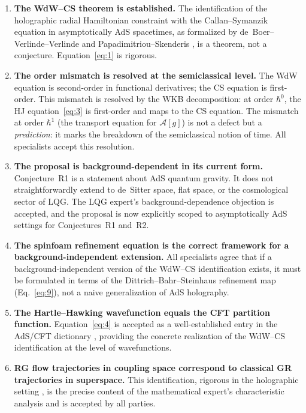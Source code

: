 \documentclass[11pt,a4paper]{article}
\begin{document}
\begin{enumerate}

  \item \textbf{The WdW--CS theorem is established.} The identification of the holographic radial Hamiltonian constraint with the Callan--Symanzik equation in asymptotically AdS spacetimes, as formalized by de~Boer--Verlinde--Verlinde and Papadimitriou--Skenderis \cite{skenderis2002}, is a theorem, not a conjecture. Equation~\eqref{eq:1} is rigorous.

  \item \textbf{The order mismatch is resolved at the semiclassical level.} The WdW equation is second-order in functional derivatives; the CS equation is first-order. This mismatch is resolved by the WKB decomposition: at order $\hbar^0$, the HJ equation~\eqref{eq:3} is first-order and maps to the CS equation. The mismatch at order $\hbar^1$ (the transport equation for $\mathcal{A}[g]$) is not a defect but a \emph{prediction}: it marks the breakdown of the semiclassical notion of time. All specialists accept this resolution.

  \item \textbf{The proposal is background-dependent in its current form.} Conjecture~R1 is a statement about AdS quantum gravity. It does not straightforwardly extend to de~Sitter space, flat space, or the cosmological sector of LQG. The LQG expert's background-dependence objection \cite{ashtekar2004} is accepted, and the proposal is now explicitly scoped to asymptotically AdS settings for Conjectures~R1 and~R2.

  \item \textbf{The spinfoam refinement equation is the correct framework for a background-independent extension.} All specialists agree that if a background-independent version of the WdW--CS identification exists, it must be formulated in terms of the Dittrich--Bahr--Steinhaus refinement map \cite{ashtekar2004,thiemann1996} (Eq.~\eqref{eq:9}), not a naive generalization of AdS holography.

  \item \textbf{The Hartle--Hawking wavefunction equals the CFT partition function.} Equation~\eqref{eq:4} is accepted as a well-established entry in the AdS/CFT dictionary \cite{witten1998,maldacena1997}, providing the concrete realization of the WdW--CS identification at the level of wavefunctions.

  \item \textbf{RG flow trajectories in coupling space correspond to classical GR trajectories in superspace.} This identification, rigorous in the holographic setting \cite{skenderis2002}, is the precise content of the mathematical expert's characteristic analysis and is accepted by all parties.

\end{enumerate}
\end{document}
